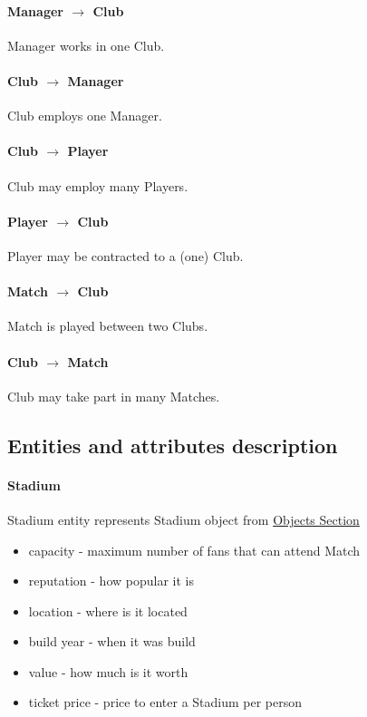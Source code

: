 \documentclass{report}
\begin{document}
\paragraph{Manager $\rightarrow$ Club}
Manager works in one Club.

\paragraph{Club $\rightarrow$ Manager}
Club employs one Manager.

\paragraph{Club $\rightarrow$ Player}
Club may employ many Players.

\paragraph{Player $\rightarrow$ Club}
Player may be contracted to a (one) Club.

\paragraph{Match $\rightarrow$ Club}
Match is played between two Clubs.

\paragraph{Club $\rightarrow$ Match}
Club may take part in many Matches.


\subsection{Entities and attributes description}
\paragraph{Stadium}
Stadium entity represents Stadium object from \hyperref[Objects Section]{Objects Section}
\begin{itemize}
    \item capacity - maximum number of fans that can attend Match
    \item reputation - how popular it is
    \item location - where is it located
    \item build year - when it was build
    \item value - how much is it worth
    \item ticket price - price to enter a Stadium per person
\end{itemize}
\end{document}
